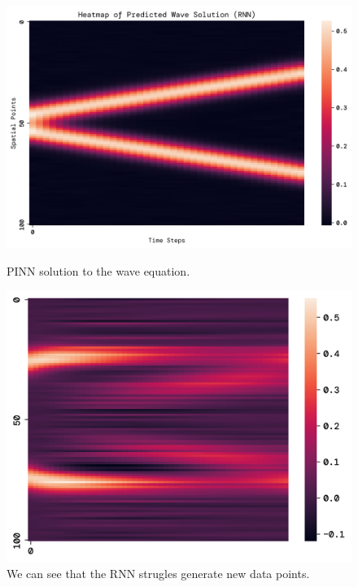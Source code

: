 \documentclass[twoside,11pt]{report}
\begin{document}
    \begin{figure}[!ht]
        \begin{minipage}[t]{0.5\textwidth - 1mm}
            \begin{center}
                \includegraphics[width=\textwidth]{../runsAndFigures/wave_rnn.png}
            \end{center}
            \caption
            {
                PINN solution to the wave equation.
            }\label{fig:wave_own_dnn}
        \end{minipage}
        \hspace{2mm}
        \begin{minipage}[t]{0.5\textwidth - 1mm}
            \begin{center}
                \includegraphics[width=\textwidth]{../runsAndFigures/wave_rnn_future.png}
            \end{center}
            \caption
            {
            We can see that the RNN strugles generate new data points. 
            }\label{fig:wave_tf_dnn}
        \end{minipage}
    \end{figure}
\end{document}
